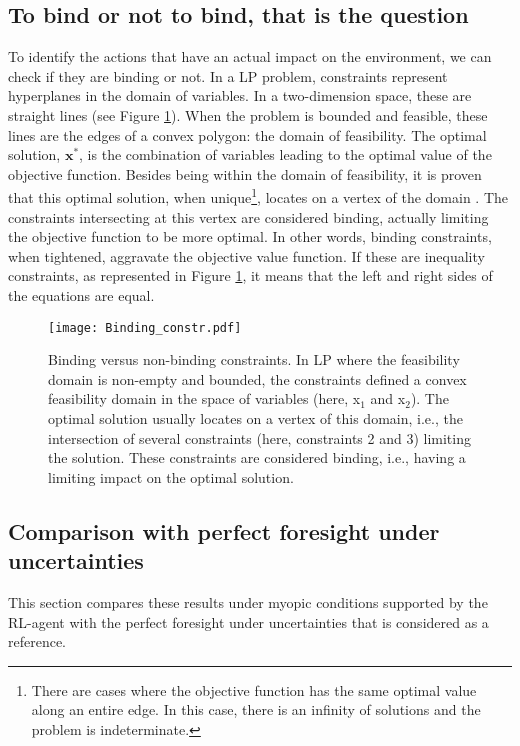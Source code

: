 \documentclass[11pt,twoside,a4paper,english]{article}
\def\ie{i.e., }
\begin{document}
\subsection{To bind or not to bind, that is the question}
\label{subsec:binding}
To identify the actions that have an actual impact on the environment, we can check if they are binding or not. In a \gls{LP} problem, constraints represent hyperplanes in the domain of variables. In a two-dimension space, these are straight lines (see Figure \ref{fig:Binding_constr}). When the problem is bounded and feasible, these lines are the edges of a convex polygon: the domain of feasibility. The optimal solution, $\textbf{x}^*$, is the combination of variables leading to the optimal value of the objective function. Besides being within the domain of feasibility, it is proven that this optimal solution, when unique\footnote{There are cases where the objective function has the same optimal value along an entire edge. In this case, there is an infinity of solutions and the problem is indeterminate.}, locates on a vertex of the domain \cite{bertsimas1997introduction}. The constraints intersecting at this vertex are considered binding, actually limiting the objective function to be more optimal. In other words, binding constraints, when tightened, aggravate the objective value function. If these are inequality constraints, as represented in Figure \ref{fig:Binding_constr}, it means that the left and right sides of the equations are equal.

\begin{figure}[!t]
\centering
\texttt{[image: Binding\_constr.pdf]}
\caption{Binding versus non-binding constraints. In \gls{LP} where the feasibility domain is non-empty and bounded, the constraints defined a convex feasibility domain in the space of variables (here, x$_1$ and x$_2$). The optimal solution usually locates on a vertex of this domain, \ie the intersection of several constraints (here, constraints 2 and 3) limiting the solution. These constraints are considered binding, \ie having a limiting impact on the optimal solution.}
\label{fig:Binding_constr}
\end{figure} 

\subsection{Comparison with perfect foresight under uncertainties}
\label{subsec:comp_PF}
This section compares these results under myopic conditions supported by the \gls{RL}-agent with the perfect foresight under uncertainties that is considered as a reference.
\end{document}
